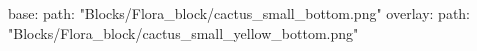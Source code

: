 base:
  path: "Blocks/Flora_block/cactus_small_bottom.png"
overlay:
  path: "Blocks/Flora_block/cactus_small_yellow_bottom.png"
